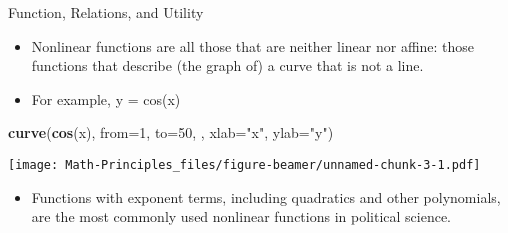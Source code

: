 \documentclass[
  ignorenonframetext,
]{beamer}
\newenvironment{Shaded}{\begin{snugshade}}{\end{snugshade}}
\newcommand{\DataTypeTok}[1]{\textcolor[rgb]{0.13,0.29,0.53}{#1}}
\newcommand{\DecValTok}[1]{\textcolor[rgb]{0.00,0.00,0.81}{#1}}
\newcommand{\KeywordTok}[1]{\textcolor[rgb]{0.13,0.29,0.53}{\textbf{#1}}}
\newcommand{\NormalTok}[1]{#1}
\newcommand{\StringTok}[1]{\textcolor[rgb]{0.31,0.60,0.02}{#1}}
\providecommand{\tightlist}{%
  \setlength{\itemsep}{0pt}\setlength{\parskip}{0pt}}
\begin{document}
\begin{frame}[fragile]{Function, Relations, and Utility}
\protect\hypertarget{function-relations-and-utility-10}{}

\begin{itemize}
\item
  Nonlinear functions are all those that are neither linear nor affine:
  those functions that describe (the graph of) a curve that is not a
  line.
\item
  For example, y = cos(x)
\end{itemize}

\begin{Shaded}
\begin{Highlighting}[]
\KeywordTok{curve}\NormalTok{(}\KeywordTok{cos}\NormalTok{(x), }\DataTypeTok{from=}\DecValTok{1}\NormalTok{, }\DataTypeTok{to=}\DecValTok{50}\NormalTok{, , }\DataTypeTok{xlab=}\StringTok{"x"}\NormalTok{, }\DataTypeTok{ylab=}\StringTok{"y"}\NormalTok{)}
\end{Highlighting}
\end{Shaded}

\texttt{[image: Math-Principles\_files/figure-beamer/unnamed-chunk-3-1.pdf]}

\begin{itemize}
\tightlist
\item
  Functions with exponent terms, including quadratics and other
  polynomials, are the most commonly used nonlinear functions in
  political science.
\end{itemize}

\end{frame}
\end{document}
